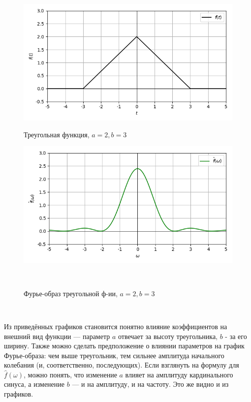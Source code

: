 \documentclass[a4paper]{article}
\begin{document}
\begin{figure}[H]
        \begin{minipage}{0.5\textwidth}
        \centering \includegraphics[width=\textwidth]{triangular/real_graph_2_3.png}
        \caption{Треугольная функция, $a = 2, b = 3$}
    \end{minipage}\hfill
    \begin{minipage}{0.5\textwidth}
        \centering \includegraphics[width=\textwidth]{triangular/real_fourier_2_3.png}
        \caption{Фурье-образ треугольной ф-ии, $a = 2, b = 3$}
    \end{minipage}\\[1em]
\end{figure}\noindent\

Из приведённых графиков становится понятно влияние коэффициентов на внешний вид функции --- параметр $a$ отвечает за высоту треугольника, $b$ - за его ширину. Также можно сделать предположение о влиянии параметров на график Фурье-образа: чем выше треугольник, тем сильнее амплитуда начального колебания (и, соответственно, последующих). Если взглянуть на формулу для $\hat{f}(\omega)$, можно понять, что изменение $a$ влияет на амплитуду кардинального синуса, а изменение $b$ --- и на амплитуду, и на частоту. Это же видно и из графиков.\
\end{document}
